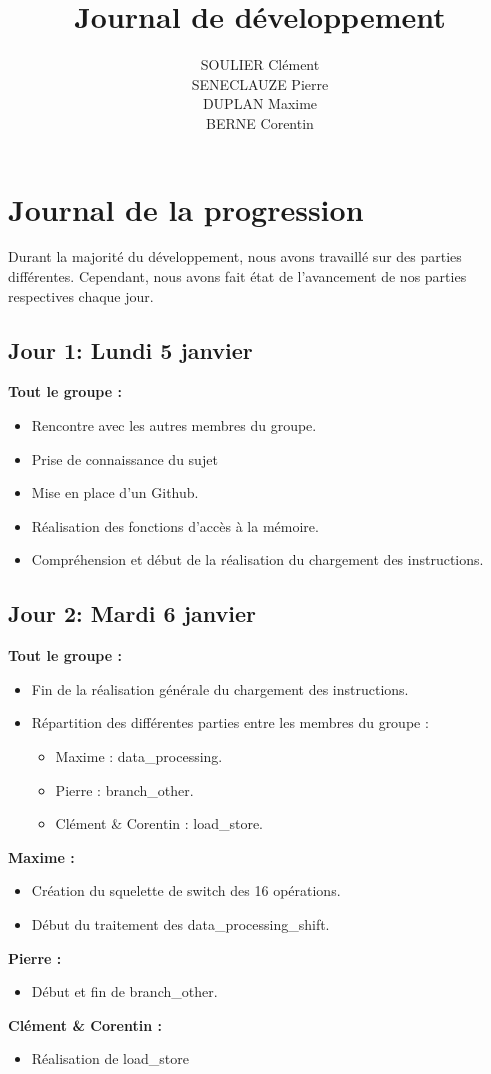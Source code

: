 \documentclass[11pt]{article} %
\title{Journal de développement}
\author{SOULIER Clément \\
SENECLAUZE Pierre \\
DUPLAN Maxime \\
BERNE Corentin}
\begin{document}
\sffamily
\maketitle

\newpage 
\section{Journal de la progression}
 
Durant la majorit\'e du d\'eveloppement, nous avons travaill\'e sur des parties diff\'erentes. Cependant, nous avons fait \'etat de l'avancement de nos parties respectives chaque jour.

\subsection{Jour 1: Lundi 5 janvier}

\textbf{Tout le groupe :}
\begin{itemize}
  \item Rencontre avec les autres membres du groupe.
  \item Prise de connaissance du sujet
  \item Mise en place d'un Github.
  \item Réalisation des fonctions d'acc\`es \`a la m\'emoire.
  \item Compr\'ehension et début de la r\'ealisation du chargement des instructions.
\end{itemize}

\subsection{Jour 2: Mardi 6 janvier}
\textbf{Tout le groupe :}
\begin{itemize}
  \item Fin de la r\'ealisation g\'en\'erale du chargement des instructions.
  \item R\'epartition des diff\'erentes parties entre les membres du groupe :
  \begin{itemize}
    \item Maxime : data\_processing.
    \item Pierre : branch\_other.
    \item Cl\'ement \& Corentin : load\_store.
  \end{itemize}
\end{itemize}
\textbf{Maxime :}
\begin{itemize}
  \item Cr\'eation du squelette de switch des 16 op\'erations.
  \item D\'ebut du traitement des data\_processing\_shift.
\end{itemize}
\textbf{Pierre :}
\begin{itemize}
  \item D\'ebut et fin de branch\_other.
\end{itemize}
\textbf{Cl\'ement \& Corentin :}
\begin{itemize}
  \item R\'ealisation de load\_store
\end{itemize}
\end{document}
